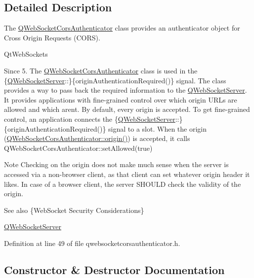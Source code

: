 \subsection{Detailed Description}
The \mbox{\hyperlink{class_q_web_socket_cors_authenticator}{Q\+Web\+Socket\+Cors\+Authenticator}} class provides an authenticator object for Cross Origin Requests (C\+O\+RS). 

Qt\+Web\+Sockets \begin{DoxySince}{Since}
5. The \mbox{\hyperlink{class_q_web_socket_cors_authenticator}{Q\+Web\+Socket\+Cors\+Authenticator}} class is used in the \{\mbox{\hyperlink{class_q_web_socket_server}{Q\+Web\+Socket\+Server}}\+:\+:\}\{origin\+Authentication\+Required()\} signal. The class provides a way to pass back the required information to the \mbox{\hyperlink{class_q_web_socket_server}{Q\+Web\+Socket\+Server}}. It provides applications with fine-\/grained control over which origin U\+R\+Ls are allowed and which aren\textquotesingle{}t. By default, every origin is accepted. To get fine-\/grained control, an application connects the \{\mbox{\hyperlink{class_q_web_socket_server}{Q\+Web\+Socket\+Server}}\+:\+:\}\{origin\+Authentication\+Required()\} signal to a slot. When the origin (\mbox{\hyperlink{class_q_web_socket_cors_authenticator_a5203b2383c444d4b4facc7f1fba283b0}{Q\+Web\+Socket\+Cors\+Authenticator\+::origin()}}) is accepted, it calls Q\+Web\+Socket\+Cors\+Authenticator\+::set\+Allowed(true)
\end{DoxySince}
\begin{DoxyNote}{Note}
Checking on the origin does not make much sense when the server is accessed via a non-\/browser client, as that client can set whatever origin header it likes. In case of a browser client, the server S\+H\+O\+U\+LD check the validity of the origin. 
\end{DoxyNote}
\begin{DoxySeeAlso}{See also}
\{Web\+Socket Security Considerations\}

\mbox{\hyperlink{class_q_web_socket_server}{Q\+Web\+Socket\+Server}} 
\end{DoxySeeAlso}


Definition at line 49 of file qwebsocketcorsauthenticator.\+h.



\subsection{Constructor \& Destructor Documentation}
\mbox{\label{class_q_web_socket_cors_authenticator_a4488fbb448e5cdcbbebc97b57c4e6b7c}} 
